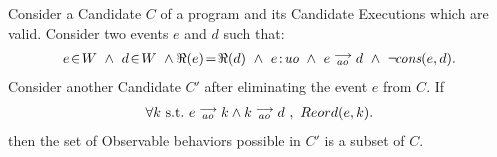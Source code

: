 \begin{corollary}
    \label{CorolWriteElim}
    Consider a Candidate $C$ of a program and its Candidate Executions which are valid. 
    Consider two events $e$ and $d$ such that:
    \begin{align*}
        \event{e}{W} \ \wedge \ \event{d}{W} \ \wedge \Re(e)\!=\!\Re(d) \ \wedge \ \et{e}{uo} \ \wedge \ \reln{e}{ao}{d} \ \wedge \ \neg\!\cons{e}{d}. 
    \end{align*} 
    Consider another Candidate $C'$ after eliminating the event $e$ from $C$.  
    If
    \begin{align*}
        \forall k \ \text{s.t.} \ e\stackrel{\longrightarrow}{_{ao}}k \wedge k\stackrel{\longrightarrow}{_{ao}}d \ , \ Reord(e, k).
    \end{align*}
    then the set of Observable behaviors possible in $C'$ is a subset of $C$.
\end{corollary}

